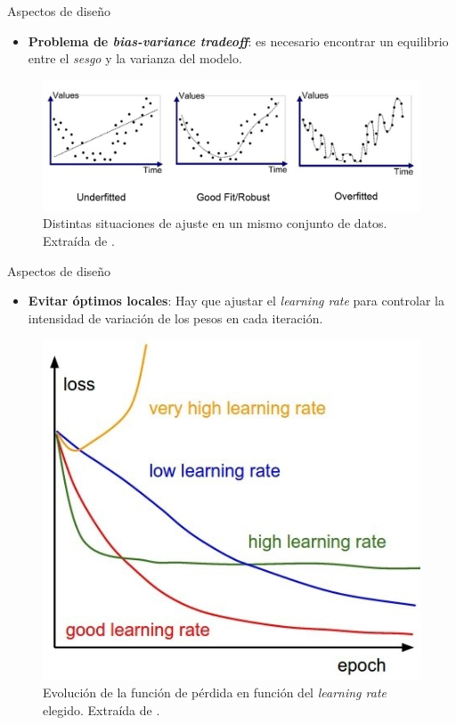 \documentclass[spanish]{beamer}
\begin{document}
\begin{frame}{Aspectos de diseño}
  \begin{itemize}
    \item \textbf{Problema de \textit{bias-variance tradeoff}}: es necesario encontrar un equilibrio entre el \textit{sesgo} y la varianza del modelo.
  \end{itemize}
  \vspace{1em}

\begin{figure}[h]
  \centering
  \includegraphics[width=.9\textwidth]{img/fit}
  \caption{Distintas situaciones de ajuste en un mismo conjunto de datos. Extraída de \parencite{bhande_fit_2018}.}
  \label{fig:fit}
\end{figure}
\end{frame}

\begin{frame}{Aspectos de diseño}
  \begin{itemize}
    \item \textbf{Evitar óptimos locales}: Hay que ajustar el \textit{learning rate} para controlar la intensidad de variación de los pesos en cada iteración.
  \end{itemize}
\vspace{1em}
\begin{figure}[h]
  \centering
  \includegraphics[width=.45\textwidth]{img/learning-rate}
  \caption{Evolución de la función de pérdida en función del \textit{learning rate} elegido. Extraída de \parencite{quora_lr_2017}.}
  \label{fig:learning-rate}
\end{figure}
\end{frame}
\end{document}
